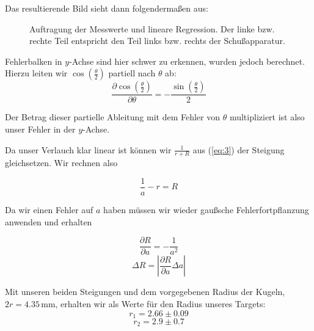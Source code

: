 \documentclass[11pt,a4paper]{article}
\begin{document}
Das resultierende Bild sieht dann folgenderma\ss en aus:

\begin{figure}[h]
\centering
{}
\renewcommand\thefigure{1}
\caption{Auftragung der Messwerte und lineare Regression. Der linke bzw. rechte Teil entspricht den Teil links bzw. rechts der Schu\ss apparatur.}
\label{Abb:1}
\end{figure}

Fehlerbalken in $y$-Achse sind hier schwer zu erkennen, wurden jedoch berechnet. Hierzu leiten wir $\cos\left(\frac{\theta}{2}\right)$ partiell nach $\theta$ ab:
\[
\frac{\partial\cos\left(\frac{\theta}{2}\right)}{\partial\theta}=-\frac{\sin\left(\frac{\theta}{2}\right)}{2}
\]

Der Betrag dieser partielle Ableitung mit dem Fehler von $\theta$ multipliziert ist also unser Fehler in der $y$-Achse.

Da unser Verlauch klar linear ist k\"onnen wir $\frac{1}{r+R}$ aus (\ref{eq:3}) der Steigung gleichsetzen. Wir rechnen also

\begin{equation}
\frac{1}{a}-r=R\label{eq:5}
\end{equation}

Da wir einen Fehler auf $a$ haben m\"ussen wir wieder gau\ss sche Fehlerfortpflanzung anwenden und erhalten

\[
\frac{\partial R}{\partial a}=-\frac{1}{a^2}
\]
\[
\Delta R=\left|\frac{\partial R}{\partial a}\Delta a\right|
\]

Mit unseren beiden Steigungen und dem vorgegebenen Radius der Kugeln, $2r=4.35\,\mathrm{mm}$, erhalten wir als Werte f\"ur den Radius unseres Targets:
\[r_1=2.66\pm0.09\]
\[r_2=2.9\pm0.7\]
\end{document}
